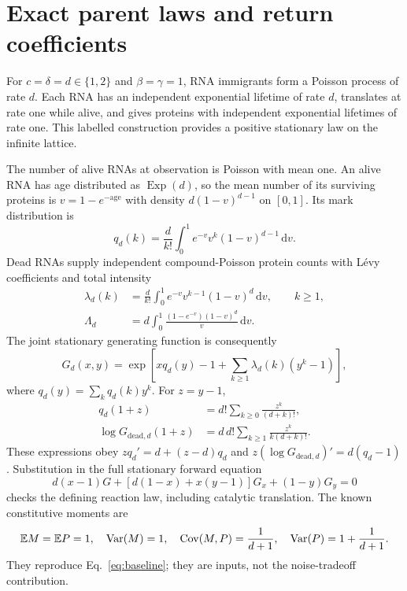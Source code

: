 \section{Exact parent laws and return coefficients}
\label{app:parent}

For $c=\delta=d\in\{1,2\}$ and $\beta=\gamma=1$, RNA immigrants form a
Poisson process of rate $d$. Each RNA has an independent exponential
lifetime of rate $d$, translates at rate one while alive, and gives proteins
with independent exponential lifetimes of rate one. This labelled
construction provides a positive stationary law on the infinite lattice.

The number of alive RNAs at observation is Poisson with mean one.
An alive RNA has age distributed as $\operatorname{Exp}(d)$, so the
mean number of its surviving proteins is $v=1-e^{-\mathrm{age}}$ with
density $d(1-v)^{d-1}$ on $[0,1]$. Its mark distribution is
\begin{equation}
 q_d(k)=\frac d{k!}\int_0^1e^{-v}v^k(1-v)^{d-1}\,\mathrm dv.
 \label{eq:qmark}
\end{equation}
Dead RNAs supply independent compound-Poisson protein counts with
L\'evy coefficients and total intensity
\begin{align}
 \lambda_d(k)&=\frac d{k!}\int_0^1e^{-v}v^{k-1}(1-v)^d\,\mathrm dv,
                  \qquad k\geq1,\nonumber\\
 \Lambda_d&=d\int_0^1\frac{(1-e^{-v})(1-v)^d}{v}\,\mathrm dv .
\end{align}
The joint stationary generating function is consequently
\begin{equation}
 G_d(x,y)=
 \exp\left[xq_d(y)-1+\sum_{k\geq1}\lambda_d(k)(y^k-1)\right],
 \label{eq:jointpgf}
\end{equation}
where $q_d(y)=\sum_kq_d(k)y^k$. For $z=y-1$,
\begin{align}
 q_d(1+z)&=d!\sum_{k\geq0}\frac{z^k}{(d+k)!},\nonumber\\
 \log G_{\mathrm{dead},d}(1+z)
 &=d\,d!\sum_{k\geq1}\frac{z^k}{k(d+k)!}.
\end{align}
These expressions obey $zq_d'=d+(z-d)q_d$ and
$z(\log G_{\mathrm{dead},d})'=d(q_d-1)$.
Substitution in the full stationary forward equation
\begin{equation}
 d(x-1)G+[d(1-x)+x(y-1)]G_x+(1-y)G_y=0
\end{equation}
checks the defining reaction law, including catalytic translation.
The known constitutive moments are
\begin{equation}
 \mathbb E M=\mathbb E P=1,\quad
 \operatorname{Var}(M)=1,\quad
 \operatorname{Cov}(M,P)=\frac1{d+1},\quad
 \operatorname{Var}(P)=1+\frac1{d+1}.
\end{equation}
They reproduce Eq.~\eqref{eq:baseline}; they are inputs, not the
noise-tradeoff contribution.

